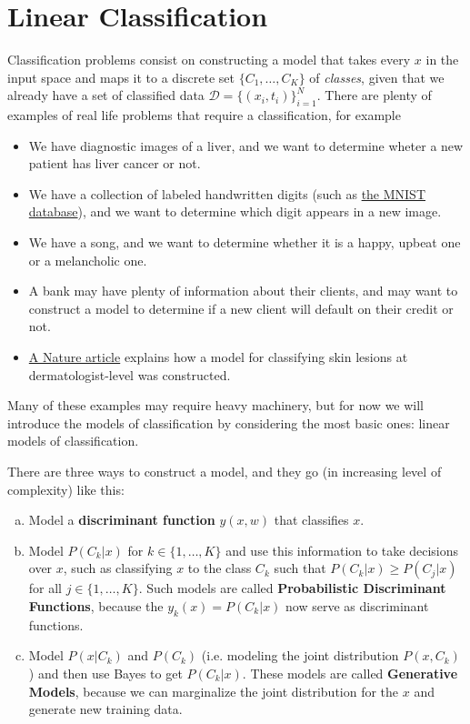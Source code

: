 
\chapter{Linear Classification}

Classification problems consist on constructing a model that takes every $x$ in the input space and maps it to a discrete set $\{C_1,\dots, C_K\}$ of \textit{classes}, given that we already have a set of classified data $\mathcal{D} = \{(x_i, t_i)\}_{i=1}^N$. There are plenty of examples of real life problems that require a classification, for example
\begin{itemize}
	\item We have diagnostic images of a liver, and we want to determine wheter a new patient has liver cancer or not.

	\item We have a collection of labeled handwritten digits (such as \href{http://yann.lecun.com/exdb/mnist/}{the MNIST database}), and we want to determine which digit appears in a new image.

	\item We have a song, and we want to determine whether it is a happy, upbeat one or a melancholic one.

	\item A bank may have plenty of information about their clients, and may want to construct a model to determine if a new client will default on their credit or not.

	\item \href{https://cs.stanford.edu/people/esteva/nature/}{A Nature article} explains how a model for classifying skin lesions at dermatologist-level was constructed.
\end{itemize}

Many of these examples may require heavy machinery, but for now we will introduce the models of classification by considering the most basic ones: linear models of classification.

There are three ways to construct a model, and they go (in increasing level of complexity) like this:

\begin{enumerate}[(a)]
	\item Model a \textbf{discriminant function} $y(x,w)$ that classifies $x$.

	\item Model $P(C_k|x)$ for $k\in\{1,\dots,K\}$ and use this information to take decisions over $x$, such as classifying $x$ to the class $C_k$ such that $P(C_k|x) \geq P(C_j|x)$ for all $j\in\{1,\dots, K\}$. Such models are called \textbf{Probabilistic Discriminant Functions}, because the $y_k(x) = P(C_k|x)$ now serve as discriminant functions.

	\item Model $P(x|C_k)$ and $P(C_k)$ (i.e. modeling the joint distribution $P(x, C_k)$) and then use Bayes to get $P(C_k|x)$. These models are called \textbf{Generative Models}, because we can marginalize the joint distribution for the $x$ and generate new training data.
\end{enumerate}

